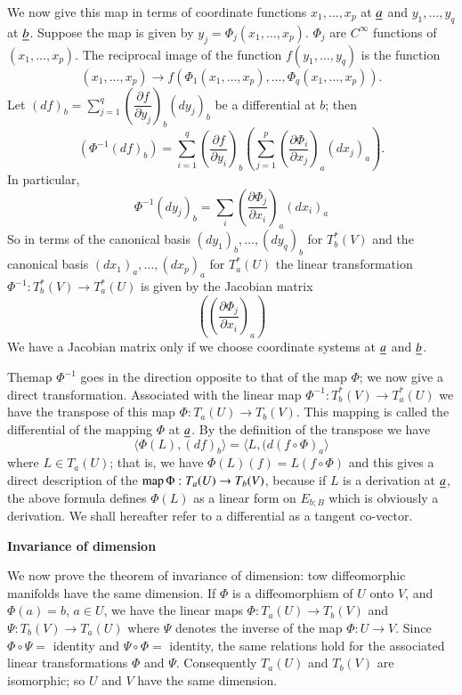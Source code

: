 We now give this map in terms of coordinate functions
$x_{1},\ldots,x_{p}$ at $\underline{a}$ and $y_{1},\ldots,y_{q}$ at
$\underline{b}$. Suppose the map is given by
$y_{j}=\Phi_{j}(x_{1},\ldots,x_{p})$. $\Phi_{j}$ are $C^{\infty}$
functions of $(x_{1},\ldots,x_{p})$. The reciprocal image of the
function $f(y_{1},\ldots,y_{q})$ is the function
$$
(x_{1},\ldots,x_{p})\to
f(\Phi_{1}(x_{1},\ldots,x_{p}),\ldots,\Phi_{q}(x_{1},\ldots,x_{p})). 
$$
Let $(df)_{b}=\sum\limits^{q}_{j=1}\left(\dfrac{\partial f}{\partial
  y_{j}}\right)_{b}(dy_{j})_{b}$ be a differential at $b$; then
$$
\left(\Phi^{-1}(df)_{b}\right)=\sum^{q}_{i=1}\left(\frac{\partial
  f}{\partial
  y_{i}}\right)_{b}\left(\sum^{p}_{j=1}\left(\frac{\partial
  \Phi_{i}}{\partial x_{j}}\right)_{a}(dx_{j})_{a}\right).
$$
In particular,
$$
\Phi^{-1}(dy_{j})_{b}=\sum_{i}\left(\dfrac{\partial \Phi_{j}}{\partial
  x_{i}}\right)_{a}(dx_{i})_{a} 
$$
So in terms of the canonical basis $(dy_{1})_{b},\ldots,(dy_{q})_{b}$
for $T^{\ast}_{b}(V)$ and the canonical basis
$(dx_{1})_{a},\ldots,(dx_{p})_{a}$ for $T_{a}^{\ast}(U)$ the linear
transformation $\Phi^{-1}:T_{b}^{\ast}(V)\to T^{\ast}_{a}(U)$ is given
by the Jacobian matrix
$$
\left(\left(\frac{\partial \Phi_{j}}{\partial x_{i}}\right)_{a}\right)
$$
We have a Jacobian matrix only if we choose coordinate systems at
$\underline{a}$ and $\underline{b}$.

The\pageoriginale map $\Phi^{-1}$ goes in the direction opposite to
that of the map $\Phi$; we now give a direct
transformation. Associated with the linear map
$\Phi^{-1}:T^{\ast}_{b}(V)\to T^{\ast}_{a}(U)$ we have the transpose
of this map $\Phi:T_{a}(U)\to T_{b}(V)$. This mapping is called the
differential of the mapping $\Phi$ at $\underline{a}$. By the definition of
the transpose we have
$$
\langle \Phi(L), (df)_{b}\rangle=\langle L,(d(f\circ\Phi)_{a}\rangle
$$
where $L\in T_{a}(U)$; that is, we have $\Phi(L)(f)=L(f\circ \Phi)$
and this gives a direct description of the $\operatorname{map} \Phi:T_{a}(U)\to
T_{b}(V)$, because if $L$ is a derivation at $\underline{a}$, the above
formula defines $\Phi(L)$ as a linear form on $E_{b;B}$ which is
obviously a derivation. We shall hereafter refer to a differential as
a tangent co-vector.

\noindent
{\bf Invariance of dimension}

We now prove the theorem of invariance of dimension: tow diffeomorphic
manifolds have the same dimension. If $\Phi$ is a diffeomorphism of
$U$ onto $V$, and $\Phi(a)=b$, $a\in U$, we have the linear maps
$\Phi:T_{a}(U)\to T_{b}(V)$ and $\Psi:T_{b}(V)\to T_{a}(U)$ where
$\Psi$ denotes the inverse of the map $\Phi:U\to V$. Since $\Phi\circ
\Psi=$ identity and $\Psi\circ \Phi=$ identity, the same relations
hold for the associated linear transformations $\Phi$ and
$\Psi$. Consequently $T_{a}(U)$ and $T_{b}(V)$ are isomorphic; so $U$
and $V$ have the same dimension.

